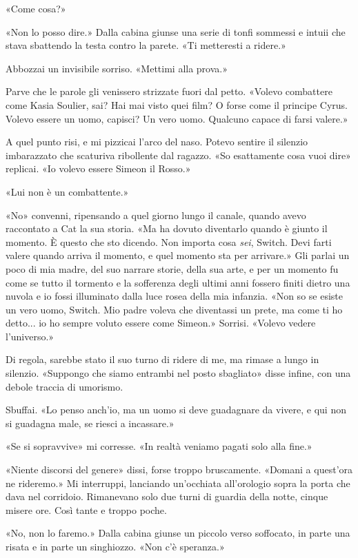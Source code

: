 «Come cosa?»

«Non lo posso dire.» Dalla cabina giunse una serie di tonfi sommessi e
intuii che stava sbattendo la testa contro la parete. «Ti metteresti a
ridere.»

Abbozzai un invisibile sorriso. «Mettimi alla prova.»

Parve che le parole gli venissero strizzate fuori dal petto. «Volevo
combattere come Kasia Soulier, sai? Hai mai visto quei film? O forse
come il principe Cyrus. Volevo essere un uomo, capisci? Un vero uomo.
Qualcuno capace di farsi valere.»

A quel punto risi, e mi pizzicai l'arco del naso. Potevo sentire il
silenzio imbarazzato che scaturiva ribollente dal ragazzo. «So
esattamente cosa vuoi dire» replicai. «Io volevo essere Simeon il
Rosso.»

«Lui non è un combattente.»

«No» convenni, ripensando a quel giorno lungo il canale, quando avevo
raccontato a Cat la sua storia. «Ma ha dovuto diventarlo quando è giunto
il momento. È questo che sto dicendo. Non importa cosa \emph{sei},
Switch. Devi farti valere quando arriva il momento, e quel momento sta
per arrivare.» Gli parlai un poco di mia madre, del suo narrare storie,
della sua arte, e per un momento fu come se tutto il tormento e la
sofferenza degli ultimi anni fossero finiti dietro una nuvola e io fossi
illuminato dalla luce rosea della mia infanzia. «Non so se esiste un
vero uomo, Switch. Mio padre voleva che diventassi un prete, ma come ti
ho detto... io ho sempre voluto essere come Simeon.» Sorrisi. «Volevo
vedere l'universo.»

Di regola, sarebbe stato il suo turno di ridere di me, ma rimase a lungo
in silenzio. «Suppongo che siamo entrambi nel posto sbagliato» disse
infine, con una debole traccia di umorismo.

Sbuffai. «Lo penso anch'io, ma un uomo si deve guadagnare da vivere, e
qui non si guadagna male, se riesci a incassare.»

«Se si sopravvive» mi corresse. «In realtà veniamo pagati solo alla
fine.»

«Niente discorsi del genere» dissi, forse troppo bruscamente. «Domani a
quest'ora ne rideremo.» Mi interruppi, lanciando un'occhiata
all'orologio sopra la porta che dava nel corridoio. Rimanevano solo due
turni di guardia della notte, cinque misere ore. Così tante e troppo
poche.

«No, non lo faremo.» Dalla cabina giunse un piccolo verso soffocato, in
parte una risata e in parte un singhiozzo. «Non c'è speranza.»

